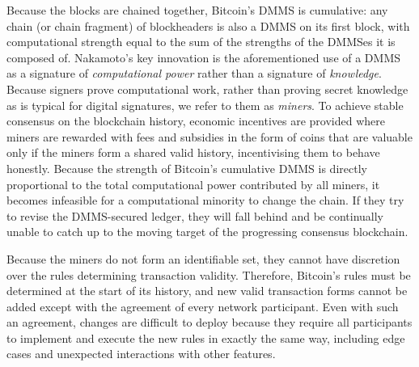 \documentclass[letterpaper]{article}
\newcommand{\hashsig}{DMMS\xspace}
\newcommand{\hashsigs}{DMMSes\xspace}
\begin{document}
Because the blocks are chained together, Bitcoin's \hashsig is cumulative: any
chain (or chain fragment) of blockheaders is also a \hashsig on its first block,
with computational strength equal to the sum of the strengths of the
\hashsigs it is composed of. Nakamoto's key innovation is the aforementioned use
of a \hashsig as a signature of \emph{computational power} rather than a
signature of \emph{knowledge}. Because signers prove computational work, rather
than proving secret knowledge as is typical for digital signatures, we refer to them
as \emph{miners}. To achieve stable consensus on the blockchain history, economic
incentives are provided where miners are rewarded with fees and subsidies in
the form of coins that are valuable only if the miners form a shared valid
history, incentivising them to behave honestly. Because the strength of Bitcoin's
cumulative \hashsig is directly proportional to the total computational power
contributed by all miners\cite{poelstra2014-3}, it
becomes infeasible for a computational minority to change the
chain. If they try to revise the \hashsig-secured ledger, they will fall
behind and be continually unable to catch up to the moving target of the
progressing consensus blockchain.

Because the miners do not form an identifiable set, they cannot have discretion over the
rules determining transaction validity. Therefore, Bitcoin's rules must be determined
at the start of its history, and new valid transaction forms cannot be added except with the
agreement of every network
participant. Even with such an agreement, changes are difficult to deploy because they
require all participants to implement and execute the new rules in exactly the same way,
including edge cases and unexpected interactions with other features.
\end{document}

